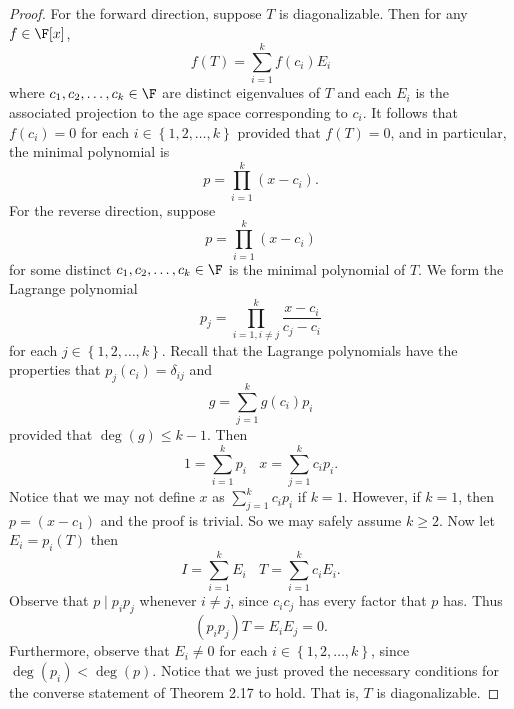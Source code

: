 \documentclass[linearalgebraII]{subfiles}
\begin{document}
    \begin{proof}
        For the forward direction, suppose $T$ is diagonalizable. Then for any $f\in \F[x]$,
        \begin{equation*}
            f(T) = \sum^{k}_{i=1} f(c_i)E_i
        \end{equation*}
        where $c_1, c_2, \ldots, c_k\in \F$ are distinct eigenvalues of $T$ and each $E_i$ is the associated projection to the age space corresponding to $c_i$. It follows that $f(c_i) = 0$ for each $i\in \left\lbrace 1, 2, \ldots, k \right\rbrace$ provided that $f(T) = 0$, and in particular, the minimal polynomial is
        \begin{equation*}
            p = \prod^{k}_{i=1} (x-c_i).
        \end{equation*}
        For the reverse direction, suppose
        \begin{equation*}
            p = \prod^{k}_{i=1} (x-c_i)
        \end{equation*}
        for some distinct $c_1, c_2, \ldots, c_k\in \F$ is the minimal polynomial of $T$. We form the Lagrange polynomial
        \begin{equation*}
            p_j = \prod^{k}_{i=1,i\neq j} \frac{x-c_i}{c_j-c_i}
        \end{equation*}
        for each $j\in \left\lbrace 1, 2, \ldots, k \right\rbrace$. Recall that the Lagrange polynomials have the properties that $p_j(c_i) = \delta_{ij}$ and
        \begin{equation*}
            g = \sum^{k}_{j=1} g(c_i)p_i
        \end{equation*}
        provided that $\deg(g)\leq k-1$. Then
        \begin{equation*}
            1 = \sum^{k}_{i=1} p_i \ \ \ \ x = \sum^{k}_{j=1} c_ip_i.
        \end{equation*}
        Notice that we may not define $x$ as $\sum^{k}_{j=1} c_ip_i$ if $k = 1$. However, if $k=1$, then $p = (x-c_1)$ and the proof is trivial. So we may safely assume $k\geq 2$. Now let $E_i = p_i(T)$ then
        \begin{equation*}
            I = \sum^{k}_{i=1} E_i \ \ \ \ T = \sum^{k}_{i=1} c_iE_i.
        \end{equation*}
        Observe that $p\mid p_ip_j$ whenever $i\neq j$, since $c_ic_j$ has every factor that $p$ has. Thus
        \begin{equation*}
            \left( p_ip_j \right)T = E_iE_j = 0.
        \end{equation*}
        Furthermore, observe that $E_i\neq 0$ for each $i\in \left\lbrace 1, 2, \ldots, k \right\rbrace$, since $\deg(p_i) < \deg(p)$. Notice that we just proved the necessary conditions for the converse statement of Theorem 2.17 to hold. That is, $T$ is diagonalizable.
    \end{proof}
\end{document}
